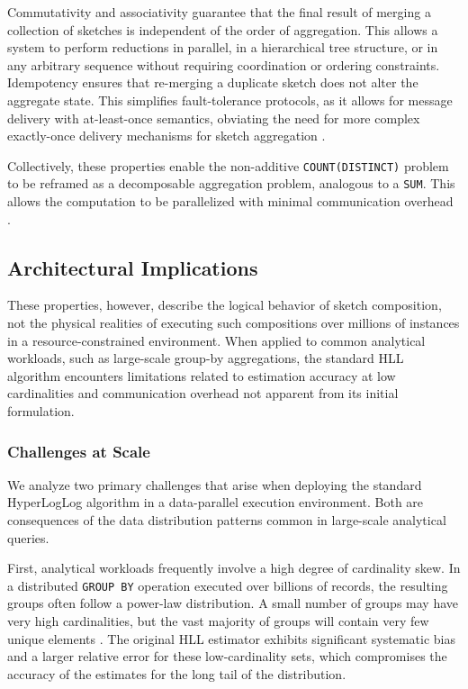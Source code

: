 Commutativity and associativity guarantee that the final result of merging a collection of sketches is independent of the order of aggregation. This allows a system to perform reductions in parallel, in a hierarchical tree structure, or in any arbitrary sequence without requiring coordination or ordering constraints. Idempotency ensures that re-merging a duplicate sketch does not alter the aggregate state. This simplifies fault-tolerance protocols, as it allows for message delivery with at-least-once semantics, obviating the need for more complex exactly-once delivery mechanisms for sketch aggregation \cite{Heule2013HyperLogLogIP}.

Collectively, these properties enable the non-additive \texttt{COUNT(DISTINCT)} problem to be reframed as a decomposable aggregation problem, analogous to a \texttt{SUM}. This allows the computation to be parallelized with minimal communication overhead \cite{Zaharia2012ResilientDD}.

\subsection{Architectural Implications}

These properties, however, describe the logical behavior of sketch composition, not the physical realities of executing such compositions over millions of instances in a resource-constrained environment. When applied to common analytical workloads, such as large-scale group-by aggregations, the standard HLL algorithm encounters limitations related to estimation accuracy at low cardinalities and communication overhead not apparent from its initial formulation.

\subsubsection{Challenges at Scale}

We analyze two primary challenges that arise when deploying the standard HyperLogLog algorithm in a data-parallel execution environment. Both are consequences of the data distribution patterns common in large-scale analytical queries.

First, analytical workloads frequently involve a high degree of cardinality skew. In a distributed \texttt{GROUP BY} operation executed over billions of records, the resulting groups often follow a power-law distribution. A small number of groups may have very high cardinalities, but the vast majority of groups will contain very few unique elements \cite{Heule2013HyperLogLogIP}. The original HLL estimator exhibits significant systematic bias and a larger relative error for these low-cardinality sets, which compromises the accuracy of the estimates for the long tail of the distribution.

